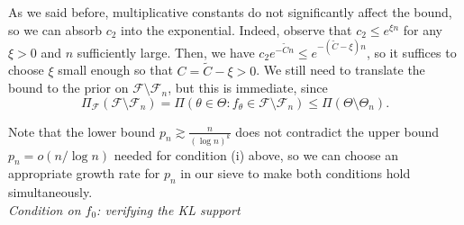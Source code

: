 As we said before, multiplicative constants do not significantly affect the bound, so we can absorb \(c_2\) into the exponential. Indeed, observe that \(c_2\leq e^{\xi n}\) for any \(\xi>0\) and \(n\) sufficiently large. Then, we have \(c_2e^{-\tilde{C}n} \leq e^{-(\tilde{C}-\xi)n}\), so it suffices to choose \(\xi\) small enough so that \(C=\tilde{C}-\xi>0\). We still need to translate the bound to the prior on \(\mathcal F \setminus \mathcal F_n\), but this is immediate, since
\[
  \Pi_{\mathcal F}(\mathcal F \setminus \mathcal F_n) = \Pi(\theta\in\Theta: f_\theta \in \mathcal F \setminus \mathcal F_n) \leq \Pi(\Theta \setminus \Theta_n).
\]

Note that the lower bound \(p_n \gtrsim \frac{n}{(\log n)^k}\) does not contradict the upper bound \(p_n=o(n/\log n)\) needed for condition (i) above, so we can choose an appropriate growth rate for \(p_n\) in our sieve to make both conditions hold simultaneously.\\

\noindent\textit{Condition on \(f_0\): verifying the KL support}

